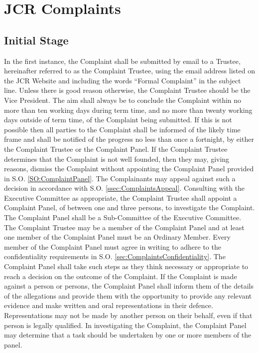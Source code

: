 \section{JCR Complaints} \label{sec:JCRComplaints}
\subsection{Initial Stage}
\npara In the first instance, the Complaint shall be submitted by email to a Trustee, hereinafter referred to as the Complaint Trustee, using the email address listed on the JCR Website and including the words ``Formal Complaint'' in the subject line.  Unless there is good reason otherwise, the Complaint Trustee should be the Vice President.
\npara The aim shall always be to conclude the Complaint within no more than ten working days during term time, and no more than twenty working days outside of term time, of the Complaint being submitted. If this is not possible then all parties to the Complaint shall be informed of the likely time frame and shall be notified of the progress no less than once a fortnight, by either the Complaint Trustee or the Complaint Panel.
\npara If the Complaint Trustee determines that the Complaint is not well founded, then they may, giving reasons, dismiss the Complaint without appointing the Complaint Panel provided in S.O. \ref{SO:ComplaintPanel}. The Complainants may appeal against such a decision in accordance with S.O. \ref{ssec:ComplaintsAppeal}.
\npara \label{SO:ComplaintPanel} Consulting with the Executive Committee as appropriate, the Complaint Trustee shall appoint a Complaint Panel, of between one and three persons, to investigate the Complaint.  The Complaint Panel shall be a Sub-Committee of the Executive Committee.  The Complaint Trustee may be a member of the Complaint Panel and at least one member of the Complaint Panel must be an Ordinary Member.  Every member of the Complaint Panel must agree in writing to adhere to the confidentiality requirements in S.O. \ref{sec:ComplaintsConfidentiality}.
\npara The Complaint Panel shall take such steps as they think necessary or appropriate to reach a decision on the outcome of the Complaint.
\npara If the Complaint is made against a person or persons, the Complaint Panel shall inform them of the details of the allegations and provide them with the opportunity to provide any relevant evidence and make written and oral representations in their defence. Representations may not be made by another person on their behalf, even if that person is legally qualified.
\npara In investigating the Complaint, the Complaint Panel may determine that a task should be undertaken by one or more members of the panel.
